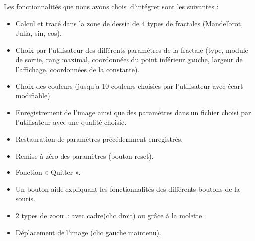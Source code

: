 \documentclass[a4paper,11pt]{article} \usepackage[T1]{fontenc} \usepackage[utf8]{inputenc} \usepackage[francais]{babel}
\begin{document}
Les fonctionnalités que nous avons choisi d'intégrer sont les suivantes :
\begin{itemize}
  \item Calcul et tracé dans la zone de dessin de 4 types de fractales (Mandelbrot, Julia, sin, cos). %
  \item Choix par l’utilisateur des différents paramètres de la fractale (type, module de sortie, rang maximal, coordonnées du point inférieur gauche, largeur de l’affichage, coordonnées de la constante).
  \item Choix des couleurs (jusqu'a 10 couleurs choisies par l’utilisateur avec écart modifiable). %
  \item Enregistrement de l’image ainsi que des paramètres dans un fichier choisi par l’utilisateur avec une qualité choisie.
  \item Restauration de paramètres précédemment enregistrés.
  \item Remise à zéro des paramètres (bouton reset).
  \item Fonction « Quitter ».
  \item Un bouton aide expliquant les fonctionnalités des différents boutons de la souris.
  \item 2 types de zoom : avec cadre(clic droit) ou grâce à la molette .
  \item Déplacement de l’image (clic gauche maintenu).
\end{itemize}
\end{document}
